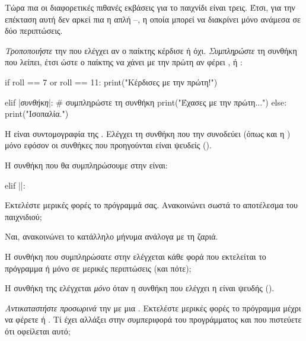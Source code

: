 \documentclass[a4paper,11pt,oneside]{book}
\begin{document}
Τώρα πια οι διαφορετικές πιθανές εκβάσεις για το παιχνίδι είναι τρεις. Έτσι, για την επέκταση αυτή δεν αρκεί πια η απλή --, η οποία μπορεί να διακρίνει μόνο ανάμεσα σε δύο περιπτώσεις.

\begin{step}
\emph{Τροποποιήστε} την  που ελέγχει αν ο παίκτης κέρδισε ή όχι. \emph{Συμπληρώστε} τη συνθήκη που λείπει, έτσι ώστε ο παίκτης να χάνει με την πρώτη αν φέρει ,  ή :

\begin{pyplain}
if roll == 7 or roll == 11:
    print("Κέρδισες με την πρώτη!")
\end{pyplain}
\begin{pynew}
elif |\textrm{\textit{συνθήκη}}|:   # συμπληρώστε τη συνθήκη
    print("Έχασες με την πρώτη...")
else:
    print("Ισοπαλία.")
\end{pynew}

Η  είναι συντομογραφία της . Ελέγχει τη συνθήκη που την συνοδεύει (όπως και η ) μόνο εφόσον οι συνθήκες που προηγούνται είναι ψευδείς ().

\begin{answer}
Η συνθήκη που θα συμπληρώσουμε στην  είναι:

\begin{pyplain}
elif ||:
\end{pyplain}
\end{answer}

Εκτελέστε μερικές φορές το πρόγραμμά σας. Ανακοινώνει σωστά το αποτέλεσμα του παιχνιδιού;

\begin{answer}
Ναι, ανακοινώνει το κατάλληλο μήνυμα ανάλογα με τη ζαριά.
\end{answer}

Η συνθήκη που συμπληρώσατε στην  ελέγχεται κάθε φορά που εκτελείται το πρόγραμμα ή μόνο σε μερικές περιπτώσεις (και πότε);

\begin{answer}
Η συνθήκη της  ελέγχεται \emph{μόνο} όταν η συνθήκη που ελέγχει η  είναι ψευδής ().
\end{answer}

\emph{Αντικαταστήστε προσωρινά} την  με μια . Εκτελέστε μερικές φορές το πρόγραμμα μέχρι να φέρετε  ή .
Τί έχει αλλάξει στην συμπεριφορά του προγράμματος και που πιστεύετε ότι οφείλεται αυτό;


\end{step}
\end{document}
